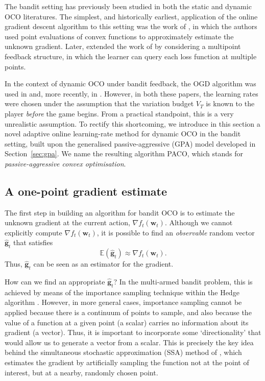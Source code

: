 The bandit setting has previously been studied in both the static and dynamic OCO literatures. The simplest, and historically earliest, application of the online gradient descent algorithm to this setting was the work of \citet{flaxman05}, in which the authors used point evaluations of convex functions to approximately estimate the unknown gradient. Later, \citet{agarwal10} extended the work of \citet{flaxman05} by considering a multipoint feedback structure, in which the learner can query each loss function at multiple points.

In the context of dynamic OCO under bandit feedback, the OGD algorithm was used in \citep{yang16} and, more recently, in \citep{gao18}. However, in both these papers, the learning rates were chosen under the assumption that the variation budget $V_T$ is known to the player \emph{before} the game begins. From a practical standpoint, this is a very unrealistic assumption. To rectify this shortcoming, we introduce in this section a novel adaptive online learning-rate method for dynamic OCO in the bandit setting, built upon the generalised passive-aggressive (GPA) model developed in Section~\ref{sec:gpa}. We name the resulting algorithm PACO, which stands for \emph{passive-aggressive convex optimisation}.

\subsection{A one-point gradient estimate}
\label{sec:gradient-estimates}

The first step in building an algorithm for bandit OCO is to estimate the unknown gradient at the current action, $\nabla f_t(\mathbf{w}_t)$. Although we cannot explicitly compute $\nabla f_t(\mathbf{w}_t)$, it is possible to find an \emph{observable} random vector $\widehat{\mathbf{g}}_t$ that satisfies
\begin{equation}
	\mathbb{E}(\widehat{\mathbf{g}}_t)
	\approx \nabla f_t(\mathbf{w}_t).
\end{equation}
Thus, $\widehat{\mathbf{g}}_t$ can be seen as an estimator for the gradient.

How can we find an appropriate $\widehat{\mathbf{g}}_t$? In the multi-armed bandit problem, this is achieved by means of the importance sampling technique within the Hedge algorithm \citep{shalev-shwartz11, adaboost}. However, in more general cases, importance sampling cannot be applied because there is a continuum of points to sample, and also because the value of a function at a given point (a scalar) carries no information about its gradient (a vector). Thus, it is important to incorporate some `directionality' that would allow us to generate a vector from a scalar. This is precisely the key idea behind the simultaneous stochastic approximation (SSA) method of \citet{spall97}, which estimates the gradient by artificially sampling the function not at the point of interest, but at a nearby, randomly chosen point.

